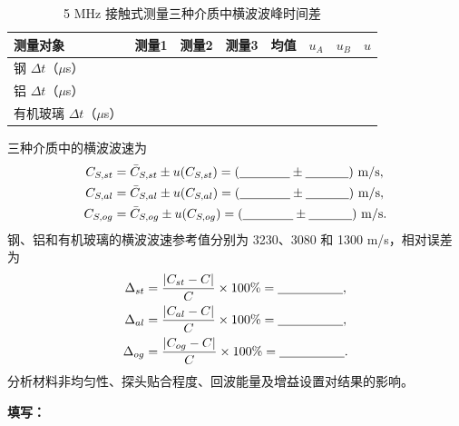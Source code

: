 \documentclass[UTF8,a4paper,12pt]{ctexart}
\newcommand{\blank}[1][2.5cm]{\mbox{\underline{\hspace{#1}}}}
\newcommand{\answer}{\par\noindent\textbf{填写：}\blank[0.86\textwidth]\par}
\numberwithin{equation}{section}
\begin{document}
\begin{table}[H]
\centering\scriptsize
\caption{5 MHz 接触式测量三种介质中横波波峰时间差}
\label{tab:exp2-S-time}
\setlength{\tabcolsep}{3pt}
\begin{tabular}{lccccccc}
\toprule
测量对象 & 测量1 & 测量2 & 测量3 & 均值 & $u_A$ & $u_B$ & $u$\\
\midrule
钢 $\Delta t$（$\mu$s） & \blank[0.8cm] & \blank[0.8cm] & \blank[0.8cm] & \blank[0.8cm] & \blank[0.9cm] & \blank[0.6cm] & \blank[0.9cm]\\
铝 $\Delta t$（$\mu$s） & \blank[0.8cm] & \blank[0.8cm] & \blank[0.8cm] & \blank[0.8cm] & \blank[0.9cm] & \blank[0.6cm] & \blank[0.9cm]\\
有机玻璃 $\Delta t$（$\mu$s） & \blank[0.8cm] & \blank[0.8cm] & \blank[0.8cm] & \blank[0.8cm] & \blank[0.9cm] & \blank[0.6cm] & \blank[0.9cm]\\
\bottomrule
\end{tabular}
\end{table}

三种介质中的横波波速为
\begin{subequations}
\begin{align}
  C_{S,st}&=\bar{C}_{S,st}\pm u(C_{S,st})=(\blank[1.4cm]\pm\blank[1.2cm])\ \mathrm{m/s},\\
  C_{S,al}&=\bar{C}_{S,al}\pm u(C_{S,al})=(\blank[1.4cm]\pm\blank[1.2cm])\ \mathrm{m/s},\\
  C_{S,og}&=\bar{C}_{S,og}\pm u(C_{S,og})=(\blank[1.4cm]\pm\blank[1.2cm])\ \mathrm{m/s}.
\end{align}
\end{subequations}
钢、铝和有机玻璃的横波波速参考值分别为 3230、3080 和 1300 m/s，相对误差为
\begin{subequations}
\begin{align}
  \Delta_{st}&=\frac{|C_{st}-C|}{C}\times100\%=\blank[1.8cm],\\
  \Delta_{al}&=\frac{|C_{al}-C|}{C}\times100\%=\blank[1.8cm],\\
  \Delta_{og}&=\frac{|C_{og}-C|}{C}\times100\%=\blank[1.8cm].
\end{align}
\end{subequations}
分析材料非均匀性、探头贴合程度、回波能量及增益设置对结果的影响。
\answer
\end{document}
